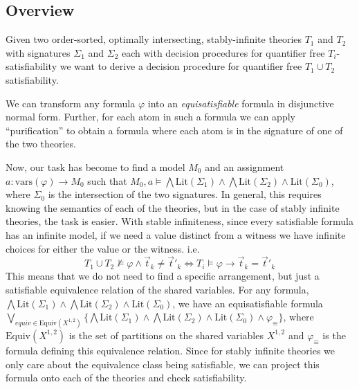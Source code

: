 \documentclass[]{article}
\renewcommand \phi {\varphi}
\newcommand \union      {\cup }
\newcommand \Or     {\bigvee}
\renewcommand \And    {\bigwedge}
\newcommand \limplies {\longrightarrow }
\newcommand \vars     {\text{vars}}
\newcommand \Lit      {\text{Lit}}
\newcommand \purified        {\And\Lit(\Sigma_1) \land \And\Lit(\Sigma_2) \land \Lit(\Sigma_0)}
\newcommand \SharedVariables {X^{1, 2}}
\newcommand \Equiv {\text{Equiv}}
\begin{document}
\hypertarget{overview}{%
\subsection{Overview}\label{overview}}

Given two order-sorted, optimally intersecting, stably-infinite theories
\(T_1\) and \(T_2\) with signatures \(\Sigma_1\) and \(\Sigma_2\) each
with decision procedures for quantifier free \(T_i\)-satisfiability we
want to derive a decision procedure for quantifier free
\(T_1 \union T_2\) satisfiability.

We can transform any formula \(\phi\) into an \emph{equisatisfiable}
formula in disjunctive normal form. Further, for each atom in such a
formula we can apply ``purification'' to obtain a formula where each
atom is in the signature of one of the two theories.

Now, our task has become to find a model \(M_0\) and an assignment
\(a: \vars(\phi) \to M_0\) such that \(M_0, a \models \purified\), where
\(\Sigma_0\) is the intersection of the two signatures. In general, this
requires knowing the semantics of each of the theories, but in the case
of stably infinite theories, the task is easier. With stable
infiniteness, since every satisfiable formula has an infinite model, if
we need a value distinct from a witness we have infinite choices for
either the value or the witness. i.e.
\[T_1 \union T_2 \not\models \phi \land \vec t_k \ne \vec t'_k 
\iff T_i \models \phi \limplies \vec t_k = \vec t'_k\] This means that
we do not need to find a specific arrangement, but just a satisfiable
equivalence relation of the shared variables. For any formula,
\(\purified\), we have an equisatisfiable formula
\(\Or_{equiv\in \Equiv(\SharedVariables)}\{ \purified \land \phi_{\equiv}\}\),
where \(\Equiv(\SharedVariables)\) is the set of partitions on the
shared variables \(\SharedVariables\) and \(\phi_\equiv\) is the formula
defining this equivalence relation. Since for stably infinite theories
we only care about the equivalence class being satisfiable, we can
project this formula onto each of the theories and check satisfiability.
\end{document}
